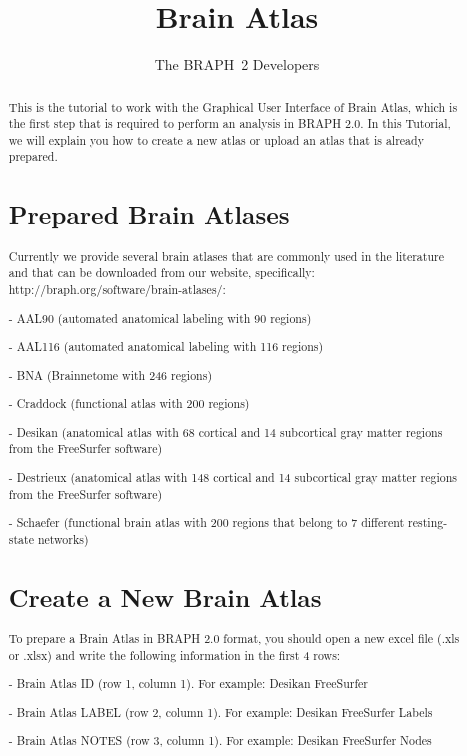 \documentclass{tufte-handout}
\title{Brain Atlas}
\author[The BRAPH~2 Developers]{The BRAPH~2 Developers}
\begin{document}
\maketitle

\begin{abstract}
\noindent
This is the tutorial to work with the Graphical User Interface of Brain Atlas, which is the first step that is required to perform an analysis in BRAPH 2.0. 
In this Tutorial, we will explain you how to create a new atlas or upload an atlas that is already prepared.

\section{Prepared Brain Atlases}

Currently we provide several brain atlases that are commonly used in the literature and that can be downloaded from our website, specifically: http://braph.org/software/brain-atlases/:


- AAL90 (automated anatomical labeling with 90 regions)


- AAL116 (automated anatomical labeling with 116 regions)


- BNA (Brainnetome with 246 regions)


- Craddock (functional atlas with 200 regions)


- Desikan (anatomical atlas with 68 cortical and 14 subcortical gray matter regions from the FreeSurfer software)


-  Destrieux (anatomical atlas with 148 cortical and 14 subcortical gray matter regions from the FreeSurfer software)


- Schaefer (functional brain atlas with 200 regions that belong to 7 different resting-state networks)


\section{Create a New Brain Atlas}

To prepare a Brain Atlas in BRAPH 2.0 format, you should open a new excel file (.xls or .xlsx) and write the following information in the first 4 rows:

- Brain Atlas ID (row 1, column 1).
For example: Desikan FreeSurfer


- Brain Atlas LABEL (row 2, column 1).
For example: Desikan FreeSurfer Labels


- Brain Atlas NOTES (row 3, column 1).
For example: Desikan FreeSurfer Nodes



\end{abstract}
\end{document}
